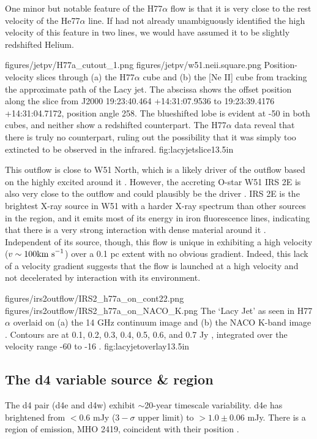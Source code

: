 One minor but notable feature of the H77$\alpha$ flow is that it is very close
to the rest velocity of the He77$\alpha$ line.  If \citet{Lacy2007a} had not
already unambiguously identified the high velocity of this feature in two
lines, we would have assumed it to be slightly redshifted Helium.

\FigureTwo
{figures/jetpv/H77a_cutout_1.png}
{figures/jetpv/w51.neii.square.png}
{Position-velocity slices through (a) the H77$\alpha$ cube and (b) the [Ne II]
cube from \citet{Lacy2007a} tracking the approximate path of the Lacy jet.  The
abscissa shows the offset position along the slice from J2000 19:23:40.464
+14:31:07.9536 to 19:23:39.4176 +14:31:04.7172, position angle 258\arcdeg.
The blueshifted lobe is evident at -50 \kms in both cubes, and neither show a
redshifted counterpart.  The H77$\alpha$ data reveal that there is truly no
counterpart, ruling out the possibility that it was simply too extincted to be
observed in the infrared.}
{fig:lacyjetslice}{1}{3.5in}

This outflow is close to W51 North, which is a likely driver of the outflow based
on the highly excited \ammonia around it \citep{Henkel2013a,Goddi2015a}.  However,
the accreting O-star W51 IRS 2E is also very close to the outflow and could plausibly
be the driver \citep{Barbosa2008a}.  IRS 2E is the brightest X-ray source in
W51 with a harder X-ray spectrum than other sources in the region, and it emits
most of its energy in iron fluorescence lines, indicating that there is a very
strong interaction with dense material around it \citep{Townsley2014a}.
Independent of its source, though, this flow is unique in exhibiting a high
velocity ($v\sim100 \textrm{km~s}^{-1}$) over a 0.1 pc extent with no obvious gradient.
Indeed, this lack of a velocity gradient suggests that the flow is launched
at a high velocity and not decelerated by interaction with its environment.


\FigureTwo
{figures/irs2outflow/IRS2_h77a_on_cont22.png} %
{figures/irs2outflow/IRS2_h77a_on_NACO_K.png} %
{The `Lacy Jet' as seen in H77$\alpha$ overlaid on (a) the 14 GHz continuum
image and (b) the NACO K-band image \citep{Barbosa2008a}.  Contours are at 
0.1, 0.2, 0.3, 0.4, 0.5, 0.6, and 0.7 Jy \kms, integrated over the velocity
range -60 to -16 \kms.}
{fig:lacyjetoverlay}{1}{3.5in}

\subsection{The d4 variable source \& \hh region}
The d4 pair (d4e and d4w) exhibit $\sim$20-year timescale variability.  d4e has
brightened from $<0.6$ mJy ($3-\sigma$ upper limit) to $>1.0\pm0.06$ mJy.
There is a region of \hh emission, MHO 2419, coincident with their position
\citep[Figure \ref{fig:d4h2}][]{Hodapp2002a,Froebrich2011a}.

